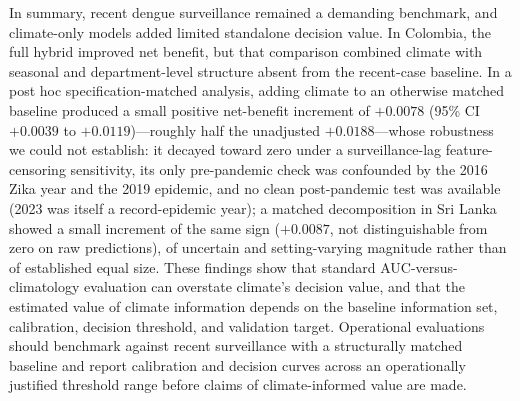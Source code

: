 \documentclass[11pt,a4paper]{article}
\begin{document}
In summary, recent dengue surveillance remained a demanding benchmark, and climate-only models added limited standalone decision value. In Colombia, the full hybrid improved net benefit, but that comparison combined climate with seasonal and department-level structure absent from the recent-case baseline. In a post hoc specification-matched analysis, adding climate to an otherwise matched baseline produced a small positive net-benefit increment of $+0.0078$ (95\% CI $+0.0039$ to $+0.0119$)---roughly half the unadjusted $+0.0188$---whose robustness we could not establish: it decayed toward zero under a surveillance-lag feature-censoring sensitivity, its only pre-pandemic check was confounded by the 2016 Zika year and the 2019 epidemic, and no clean post-pandemic test was available (2023 was itself a record-epidemic year); a matched decomposition in Sri Lanka showed a small increment of the same sign ($+0.0087$, not distinguishable from zero on raw predictions), of uncertain and setting-varying magnitude rather than of established equal size. These findings show that standard AUC-versus-climatology evaluation can overstate climate's decision value, and that the estimated value of climate information depends on the baseline information set, calibration, decision threshold, and validation target. Operational evaluations should benchmark against recent surveillance with a structurally matched baseline and report calibration and decision curves across an operationally justified threshold range before claims of climate-informed value are made.

\end{document}
